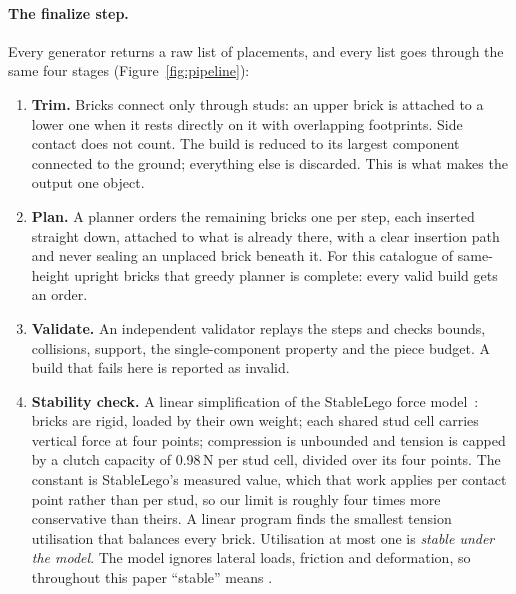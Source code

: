 \paragraph{The finalize step.} Every generator returns a raw list of placements, and every list goes through the
same four stages (Figure~\ref{fig:pipeline}):
\begin{enumerate}
  \item \textbf{Trim.} Bricks connect only through studs: an upper brick is attached to a lower one when it rests
  directly on it with overlapping footprints. Side contact does not count. The build is reduced to its largest
  component connected to the ground; everything else is discarded. This is what makes the output one object.
  \item \textbf{Plan.} A planner orders the remaining bricks one per step, each inserted straight down, attached to
  what is already there, with a clear insertion path and never sealing an unplaced brick beneath it. For this
  catalogue of same-height upright bricks that greedy planner is complete: every valid build gets an order.
  \item \textbf{Validate.} An independent validator replays the steps and checks bounds, collisions, support, the
  single-component property and the piece budget. A build that fails here is reported as invalid.
  \item \textbf{Stability check.} A linear simplification of the StableLego force model~\citep{liu2024stablelego}: bricks
  are rigid, loaded by their own weight; each shared stud cell carries vertical force at four points; compression is
  unbounded and tension is capped by a clutch capacity of 0.98\,N per stud cell, divided over its four points. The
  constant is StableLego's measured value, which that work applies per contact point rather than per stud, so our
  limit is roughly four times more conservative than theirs. A linear program
  finds the smallest tension utilisation that balances every brick. Utilisation at most one is \emph{stable under the
  model}. The model ignores lateral loads, friction and deformation, so throughout this paper ``stable'' means
  \stablenote.
\end{enumerate}

